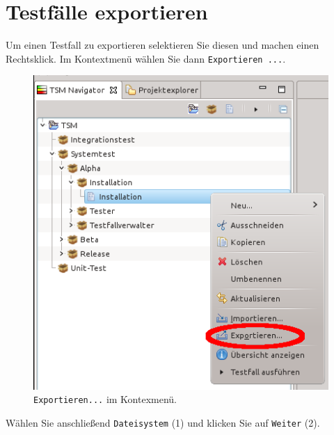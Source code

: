 \documentclass[11pt,a4paper,titlepage]{article}
\begin{document}
\section{Testfälle exportieren}
Um einen Testfall zu exportieren selektieren Sie diesen und machen einen Rechtsklick. Im Kontextmenü wählen Sie dann \texttt{Exportieren ...}.
\begin{figure}[H]
 \centering
 \includegraphics{./kontextmenue-exp.png}
 \caption{\texttt{Exportieren...} im Kontexmenü.}
 \label{abb:Kontextmenue-exp}
\end{figure}
\vspace{\baselineskip}
Wählen Sie anschließend \texttt{Dateisystem} (1) und klicken Sie auf \texttt{Weiter} (2).
\end{document}
